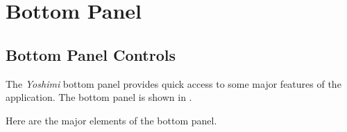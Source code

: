 %
%
%

\section{Bottom Panel}
\label{sec:bottom_panel}

\subsection{Bottom Panel Controls}
\label{subsec:bottom_panel_controls}

   The \textsl{Yoshimi} bottom panel provides quick access to some major
   features of the application.
   The bottom panel is shown in
   .

   Here are the major elements of the bottom panel.

